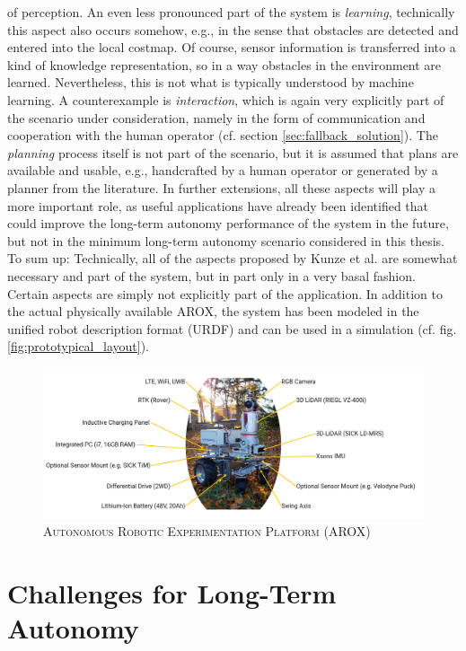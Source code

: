 \documentclass[english, master, utf8]{base/thesis_KBS}
\begin{document}
of perception. An even less pronounced part of the system is \textit{learning}, technically this aspect also occurs somehow, e.g., in the sense that obstacles are detected and entered
into the local costmap. Of course,
sensor information is transferred into a kind of knowledge representation, so in a way obstacles in the environment are learned. Nevertheless, this is not what is typically
understood by machine learning. A counterexample is \textit{interaction}, which is again very explicitly part of the scenario under consideration, namely in the form of communication and
cooperation with the human operator (cf. section \ref{sec:fallback_solution}). The \textit{planning} process itself is not part of the scenario, but it is assumed that plans are available and usable,
e.g., handcrafted by a human operator or generated by a planner from the literature. In further extensions, all these aspects will play a more important role, as useful applications
have already been identified that could improve the long-term autonomy performance of the system in the future, but not in the minimum long-term autonomy scenario considered in this
thesis. To sum up: Technically, all of the aspects proposed by Kunze et al. are somewhat necessary and part of the system, but in part only in a very basal fashion. Certain aspects
are simply not explicitly part of the application. In addition to the actual physically available AROX, the system has been modeled in the unified robot description format (URDF) and
can be used in a simulation (cf. fig. \ref{fig:prototypical_layout}).
\begin{figure}[H]
    \centering
    \includegraphics[width=\textwidth]{pics/AROX.jpg}
    \caption{\textsc{Autonomous Robotic Experimentation Platform (AROX)}}
    \label{fig:arox_system}
\end{figure}

\section{Challenges for Long-Term Autonomy}
\label{sec:challenges_for_lta}
\end{document}
